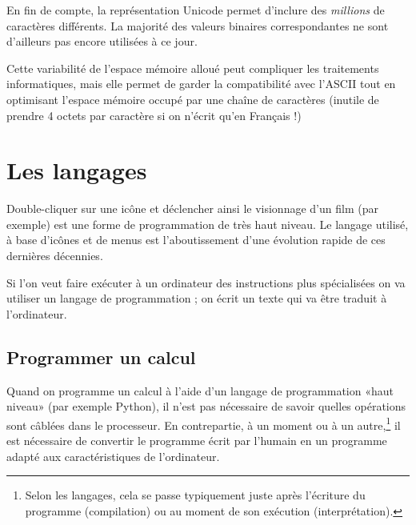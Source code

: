En fin de compte, la représentation Unicode permet d'inclure des \emph{millions} de caractères différents. La majorité des valeurs binaires correspondantes ne sont d'ailleurs pas encore utilisées à ce jour.

Cette variabilité de l'espace mémoire alloué peut compliquer les traitements informatiques, mais elle permet de garder la compatibilité avec l'ASCII tout en optimisant l'espace mémoire occupé par une chaîne de caractères (inutile de prendre 4 octets par caractère si on n'écrit qu'en Français !)
\section{Les langages} 
Double-cliquer sur une icône et déclencher ainsi le visionnage d'un film (par exemple) est une forme de programmation de très haut niveau. Le langage utilisé, à base d'icônes et de menus est l'aboutissement d'une évolution rapide de ces dernières décennies.

Si l'on veut faire exécuter à un ordinateur des instructions plus spécialisées on va utiliser un langage de programmation ; on écrit un texte qui va être traduit à l'ordinateur.
\subsection{Programmer un calcul}
Quand on programme un calcul à l'aide d'un langage de programmation «haut niveau» (par exemple Python), il n'est pas nécessaire de savoir quelles opérations sont câblées dans le processeur. En contrepartie, à un moment ou à un autre,\footnote{Selon les langages, cela se passe typiquement juste après l'écriture du programme (compilation) ou au moment de son exécution (interprétation).} il est nécessaire de convertir le programme écrit par l'humain en un programme adapté aux caractéristiques de l'ordinateur.

